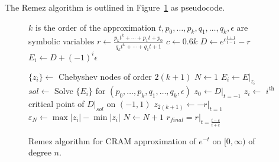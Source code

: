 The Remez algorithm is outlined in Figure~\ref{remez-pseudocode} as pseudocode.

\begin{figure}
  \caption{Remez algorithm for CRAM approximation of $e^{-t}$ on $[0, \infty)$
  of degree $n$.}
  \label{remez-pseudocode}
  \begin{algorithmic}
    \STATE {}
    \STATE $k$ is the order of the approximation
    \STATE \COMMENT{translate $[0, \infty)$ to $[-1, 1)$}
    \STATE $t, p_0, \ldots, p_k, q_1, \ldots, q_k, \epsilon$ are symbolic variables
    \STATE $r \leftarrow \frac{p_kt^k + \cdots + p_1t + p_0}{q_kt^k + \cdots +
      q_1t + 1}$
    \STATE $c \leftarrow 0.6k$
    \STATE $D \leftarrow e^{c\frac{t+1}{t-1}} - r$
    \STATE $E_i \leftarrow D + (-1)^i\epsilon$

    \STATE $\{z_i\} \leftarrow$ Chebyshev nodes of order $2(k+1)$
    \STATE $N \leftarrow 1$
    \REPEAT
      \STATE $E_i \leftarrow E|_{z_i}$
      \STATE $sol \leftarrow$ Solve $\{E_i\}$ for $(p_0,\ldots,p_k,q_1,\ldots,q_k,\epsilon)$
      \STATE $z_0 \leftarrow D|_{t=-1}$
      \STATE $z_i \leftarrow$ $i^\mathrm{th}$ critical point of $D|_{sol}$ on
      $(-1, 1)$ 
      \STATE $z_{2(k + 1)} \leftarrow -r|_{t=1}$ 
      \STATE $\varepsilon_N \leftarrow \max{|z_i|} - \min{|z_i|}$
      \STATE $N \leftarrow N + 1$
    \STATE $r_{final} = r|_{t=\frac{t - c}{t + c}}$ \COMMENT{translate $[-1, 1)$ back to $[0, \infty)$ and normalize $q_0=1$}
  \end{algorithmic}
\end{figure}
